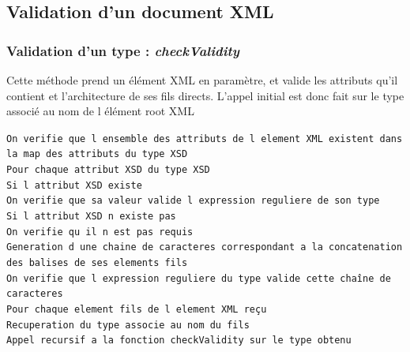 \pagebreak

\subsection{Validation d'un document XML}
	\subsubsection{Validation d'un type : \textit{checkValidity}}
		Cette méthode prend un élément XML en paramètre, et valide les attributs qu'il contient et l'architecture de ses fils directs.
		L'appel initial est donc fait sur le type associé au nom de l élément root XML
		
		\lstinline$On verifie que l ensemble des attributs de l element XML existent dans la map des attributs du type XSD$\\
		\lstinline$Pour chaque attribut XSD du type XSD$\\
		\indent \lstinline$Si l attribut XSD existe$\\
		\indent \indent \lstinline$On verifie que sa valeur valide l expression reguliere de son type$\\
		\indent \lstinline$Si l attribut XSD n existe pas$\\
		\indent \indent \lstinline$On verifie qu il n est pas requis$\\
		
		\lstinline$Generation d une chaine de caracteres correspondant a la concatenation des balises de ses elements fils$\\
		\lstinline$On verifie que l expression reguliere du type valide cette chaîne de caracteres$\\
		
		\lstinline$Pour chaque element fils de l element XML reçu$\\
		\indent \lstinline$Recuperation du type associe au nom du fils$\\
		\indent \lstinline$Appel recursif a la fonction checkValidity sur le type obtenu$\\
		
